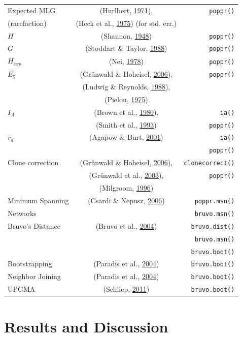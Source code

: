 \documentclass[double,11pt]{beavtex}
\begin{document}
\begin{longtable}[h!]{@{}lcr@{}}
  Expected MLG  & (Hurlbert, \protect\hyperlink{ref-hurlbert1971nonconcept}{1971}), & \texttt{poppr()}\tabularnewline
  (rarefaction) & (Heck et al., \protect\hyperlink{ref-heck1975explicit}{1975}) (for std. err.) & \tabularnewline
  \hline
  \(H\) & (Shannon, \protect\hyperlink{ref-shannon2001mathematical}{1948}) & \texttt{poppr()}\tabularnewline
  \hline
  \(G\) & (Stoddart \& Taylor,
  \protect\hyperlink{ref-stoddart1988genotypic}{1988}) & \texttt{poppr()}\tabularnewline
  \hline
  \(H_{exp}\) & (Nei, \protect\hyperlink{ref-Nei:1978}{1978}) & \texttt{poppr()}\tabularnewline
  \hline
  \(E_{5}\) & (Grünwald \& Hoheisel,
  \protect\hyperlink{ref-grunwald2006hierarchical}{2006}), & \texttt{poppr()}\tabularnewline
   & (Ludwig \& Reynolds,
  \protect\hyperlink{ref-ludwig1988statistical}{1988}), & \tabularnewline
   & (Pielou, \protect\hyperlink{ref-pielou1975ecological}{1975}) & \tabularnewline
  \hline
  \(I_A\) & (Brown et al., \protect\hyperlink{ref-brown1980multilocus}{1980}), & \texttt{ia()}\tabularnewline 
   & (Smith et al., \protect\hyperlink{ref-smith1993how}{1993}) & \texttt{poppr()}\tabularnewline
  \hline
  \(\bar{r}_d\) &  (Agapow \& Burt, \protect\hyperlink{ref-Agapow_2001}{2001}) & \texttt{ia()}\tabularnewline 
  & & \texttt{poppr()}\tabularnewline
  \hline
  Clone correction & (Grünwald \& Hoheisel,
  \protect\hyperlink{ref-grunwald2006hierarchical}{2006}), & \texttt{clonecorrect()}\tabularnewline 
   & (Grünwald et al., \protect\hyperlink{ref-grunwald2003analysis}{2003}), & \texttt{poppr()}\tabularnewline
   & (Milgroom, \protect\hyperlink{ref-milgroom1996recombination}{1996}) & \tabularnewline
  \hline
  Minimum Spanning & (Csardi \& Nepusz, \protect\hyperlink{ref-csardi2006igraph}{2006}) & \texttt{poppr.msn()}\tabularnewline 
  Networks & & \texttt{bruvo.msn()}\tabularnewline
  \hline
  Bruvo's Distance & (Bruvo et al., \protect\hyperlink{ref-bruvo2004simple}{2004}) & \texttt{bruvo.dist()}\tabularnewline 
  & & \texttt{bruvo.msn()}\tabularnewline 
  & & \texttt{bruvo.boot()}\tabularnewline
  \hline
  Bootstrapping & (Paradis et al., \protect\hyperlink{ref-paradis2004ape}{2004}) & \texttt{bruvo.boot()}\tabularnewline 
  \hline
  Neighbor Joining & (Paradis et al., \protect\hyperlink{ref-paradis2004ape}{2004}) & \texttt{bruvo.boot()}\tabularnewline
  \hline
  UPGMA & (Schliep, \protect\hyperlink{ref-phangorn}{2011}) & \texttt{bruvo.boot()}\tabularnewline 
  \bottomrule
  \end{longtable}
  
  \section{Results and Discussion}\label{results-and-discussion}
  
\end{document}
